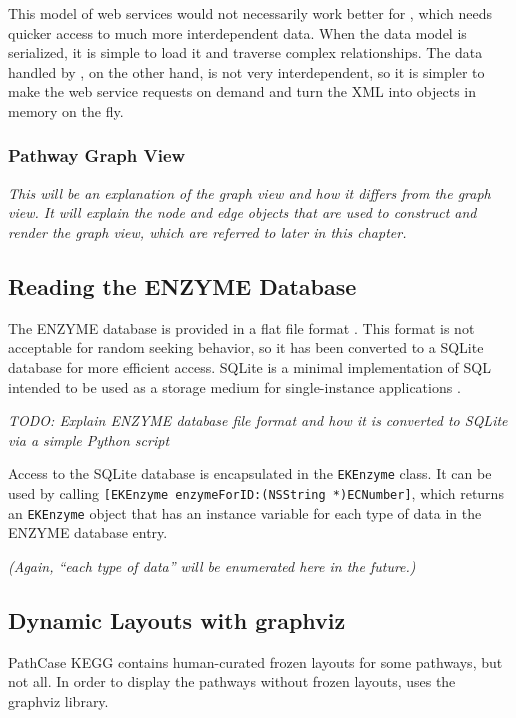 This model of web services would not necessarily work better for \mawapp,
which needs quicker access to much more interdependent data. When the data model
is serialized, it is simple to load it and traverse complex relationships. The
data handled by \keggapp, on the other hand, is not very interdependent, so
it is simpler to make the web service requests on demand and turn the XML into
objects in memory on the fly.

\subsubsection{Pathway Graph View}
\label{sect:kegg_impl_graph_view}

\emph{This will be an explanation of the \keggapp graph view and how it differs
from the \mawapp graph view. It will explain the node and edge objects that are
used to construct and render the graph view, which are referred to later in this
chapter.}

\subsection{Reading the ENZYME Database}
\label{sect:kegg_impl_enzyme}

The ENZYME database is provided in a flat file format \cite{enzyme:enzuser}.
This format is not acceptable for random seeking behavior, so it has been
converted to a SQLite database \cite{sqlite:main} for more efficient access.
SQLite is a minimal implementation of SQL intended to be used as a storage
medium for single-instance applications \cite{sqlite:main}.

\emph{TODO: Explain ENZYME database file format and how it is converted to
SQLite via a simple Python script}

Access to the SQLite database is encapsulated in the \texttt{EKEnzyme} class. It
can be used by calling \texttt{[EKEnzyme enzymeForID:(NSString *)ECNumber]},
which returns an \texttt{EKEnzyme} object that has an instance variable for each
type of data in the ENZYME database entry.

\emph{(Again, ``each type of data'' will be enumerated here in the future.)}

\subsection{Dynamic Layouts with graphviz}
\label{sect:kegg_impl_graphviz}

PathCase KEGG contains human-curated frozen layouts for some pathways, but not
all. In order to display the pathways without frozen layouts, \keggapp
uses the graphviz library.

